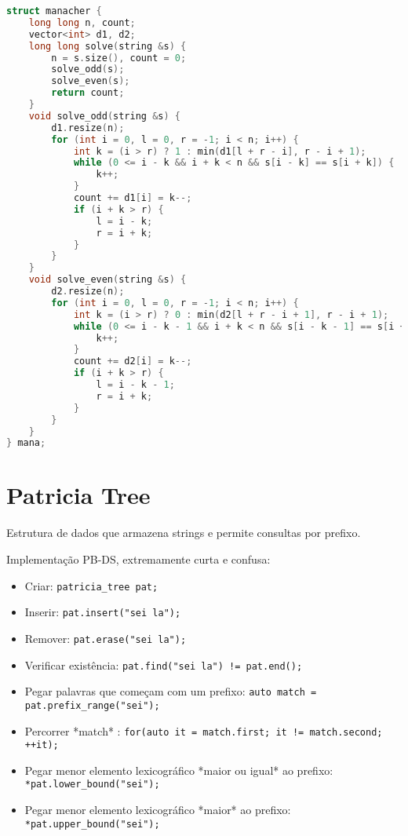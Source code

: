 \documentclass[10pt, a4paper, oneside]{book}
\begin{document}
\begin{lstlisting}[language=C++]
struct manacher {
    long long n, count;
    vector<int> d1, d2;
    long long solve(string &s) {
        n = s.size(), count = 0;
        solve_odd(s);
        solve_even(s);
        return count;
    }
    void solve_odd(string &s) {
        d1.resize(n);
        for (int i = 0, l = 0, r = -1; i < n; i++) {
            int k = (i > r) ? 1 : min(d1[l + r - i], r - i + 1);
            while (0 <= i - k && i + k < n && s[i - k] == s[i + k]) {
                k++;
            }
            count += d1[i] = k--;
            if (i + k > r) {
                l = i - k;
                r = i + k;
            }
        }
    }
    void solve_even(string &s) {
        d2.resize(n);
        for (int i = 0, l = 0, r = -1; i < n; i++) {
            int k = (i > r) ? 0 : min(d2[l + r - i + 1], r - i + 1);
            while (0 <= i - k - 1 && i + k < n && s[i - k - 1] == s[i + k]) {
                k++;
            }
            count += d2[i] = k--;
            if (i + k > r) {
                l = i - k - 1;
                r = i + k;
            }
        }
    }
} mana;
\end{lstlisting}
\hfill

\section{Patricia Tree}


Estrutura de dados que armazena strings e permite consultas por prefixo.



Implementação PB-DS, extremamente curta e confusa:



\begin{itemize}
\item Criar: \lstinline{patricia_tree pat;}
\item Inserir: \lstinline{pat.insert("sei la");}
\item Remover: \lstinline{pat.erase("sei la");}
\item Verificar existência: \lstinline{pat.find("sei la") != pat.end();}
\item Pegar palavras que começam com um prefixo: \lstinline{auto match = pat.prefix_range("sei");}
\item Percorrer *match* : \lstinline{for(auto it = match.first; it != match.second; ++it);}
\item Pegar menor elemento lexicográfico *maior ou igual* ao prefixo: \lstinline{*pat.lower_bound("sei");}
\item Pegar menor elemento lexicográfico *maior* ao prefixo: \lstinline{*pat.upper_bound("sei");}
\end{itemize}
\end{document}
